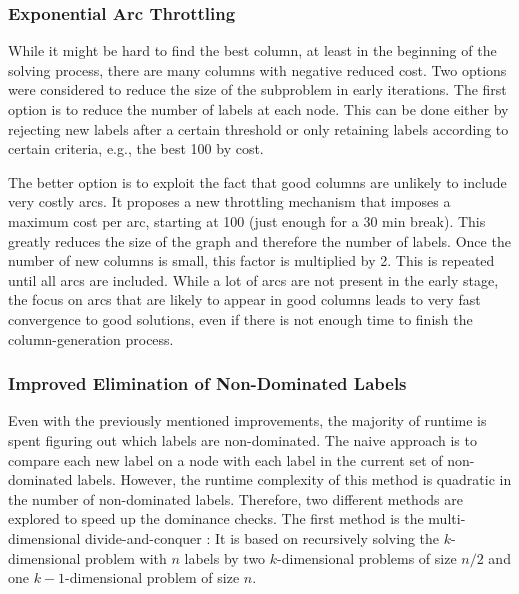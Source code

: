 \documentclass[]{amsart}
\theoremstyle{plain}
\begin{document}
\subsubsection{Exponential Arc Throttling}

While it might be hard to find the best column, at least in the beginning of the solving process, there are many columns with negative reduced cost. Two options were considered to reduce the size of the subproblem in early iterations. The first option is to reduce the number of labels at each node. This can be done either by rejecting new labels after a certain threshold or only retaining labels according to certain criteria, e.g., the best 100 by cost.

The better option is to exploit the fact that good columns are unlikely to include very costly arcs. It proposes a new throttling mechanism that imposes a maximum cost per arc, starting at 100 (just enough for a 30 min break). This greatly reduces the size of the graph and therefore the number of labels. Once the number of new columns is small, this factor is multiplied by 2. This is repeated until all arcs are included. While a lot of arcs are not present in the early stage, the focus on arcs that are likely to appear in good columns leads to very fast convergence to good solutions, even if there is not enough time to finish the column-generation process.

\subsubsection{Improved Elimination of Non-Dominated Labels}

Even with the previously mentioned improvements, the majority of runtime is spent figuring out which labels are non-dominated. The naive approach is to compare each new label on a node with each label in the current set of non-dominated labels. However, the runtime complexity of this method is quadratic in the number of non-dominated labels. Therefore, two different methods are explored to speed up the dominance checks. The first method is the multi-dimensional divide-and-conquer \cite{bentley1980multidimensional}: It is based on recursively solving the $k$-dimensional problem with $n$ labels by two $k$-dimensional problems of size $n/2$ and one $k-1$-dimensional problem of size $n$.
\end{document}
